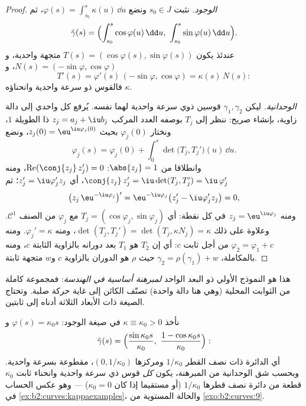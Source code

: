 \begin{proof}
\emph{الوجود.} نثبت $s_0 \in J$ ونضع $\varphi(s) =
\int_{s_0}^s \kappa(u)\,\dd u$، ثم
\[
\tilde\gamma(s) = \Bigl(\int_{s_0}^s \cos\varphi(u)\,\dd u,\
\int_{s_0}^s \sin\varphi(u)\,\dd u\Bigr).
\]
عندئذ يكون $T(s) = (\cos\varphi(s), \sin\varphi(s))$ متجهة واحدية، و$N(s) = (-\sin\varphi, \cos\varphi)$، و
\[
T'(s) = \varphi'(s)\,(-\sin\varphi, \cos\varphi)
= \kappa(s)\,N(s) :
\]
فالقوس ذو سرعة واحدية وانحناؤه $\kappa$.

\emph{الوحدانية.} ليكن $\gamma_1, \gamma_2$ قوسين ذوي سرعة واحدية لهما 
نفسه. يُرفع كل \omterm{def:b2:curves:arc}{مماس} واحدي إلى دالة زاوية، بإنشاء صريح: ننظر إلى
$T_j$ بوصفه العدد المركب $z_j = a_j + \iu b_j$ ذا الطويلة $1$، ونختار $\varphi_j(0)$
بحيث $z_j(0) = \eu^{\iu\varphi_j(0)}$، ونضع
\[
\varphi_j(s) = \varphi_j(0) + \int_0^s\det\bigl(T_j,
T_j'\bigr)(u)\,\dd u .
\]
وانطلاقا من $\abs{z_j} = 1$: $\operatorname{Re}(\conj{z_j}\,z_j') =
0$، ومنه $\conj{z_j}\,z_j' = \iu\det(T_j, T_j') =
\iu\,\varphi_j'$، أي $z_j' = \iu\varphi_j'z_j$؛ ثم
\[
\bigl(z_j\,\eu^{-\iu\varphi_j}\bigr)'
= \eu^{-\iu\varphi_j}\bigl(z_j' - \iu\varphi_j'z_j\bigr) = 0,
\]
ومنه $z_j = \eu^{\iu\varphi_j}$ في كل نقطة: أي $T_j =
(\cos\varphi_j, \sin\varphi_j)$ مع $\varphi_j$ من الصنف $\mathcal C^1$.
وعلاوة على ذلك $\det(T_j, T_j') = \det(T_j,
\kappa N_j) = \kappa$، ومنه $\varphi_j' = \kappa$. ومنه $\varphi_2 = \varphi_1 + c$ من أجل ثابت $c$:
أي إن $T_2$ هو $T_1$ بعد دورانه بالزاوية الثابتة $c$، ومنه
بالمكاملة، $\gamma_2 = \rho(\gamma_1) + w$ حيث $\rho$ هو الدوران بالزاوية $c$ و$w$
متجهة ثابتة.
\end{proof}

\begin{remark}
هذا هو النموذج الأولي ذو البعد الواحد \emph{لمبرهنة أساسية في
الهندسة}: فمجموعة كاملة من الثوابت المحلية (وهي هنا دالة واحدة)
تصنّف الكائن إلى غاية حركة صلبة. وتحتاج الصيغة ذات الأبعاد الثلاثة
أدناه إلى ثابتين.
\end{remark}

\begin{example}\label{ex:b2:curves:constantkappa}
نأخذ $\kappa \equiv \kappa_0 > 0$ في صيغة الوجود: $\varphi(s) = \kappa_0 s$ و
\[
\tilde\gamma(s) = \Bigl(\frac{\sin\kappa_0s}{\kappa_0},\
\frac{1 - \cos\kappa_0s}{\kappa_0}\Bigr) :
\]
أي الدائرة ذات نصف القطر $1/\kappa_0$ ومركزها $(0,
1/\kappa_0)$، مقطوعة بسرعة
واحدية. وبحسب شق الوحدانية من المبرهنة، يكون \emph{كل} قوس ذي سرعة
واحدية وانحناء ثابت $\kappa_0$ قطعة من دائرة نصف قطرها $1/\kappa_0$ (أو
مستقيما إذا كان $\kappa_0 = 0$) --- وهو عكس الحساب في \cref{ex:b2:curves:kappaexamples}، والحالة
المستوية من \cref{exo:b2:curves:9}.
\end{example}

